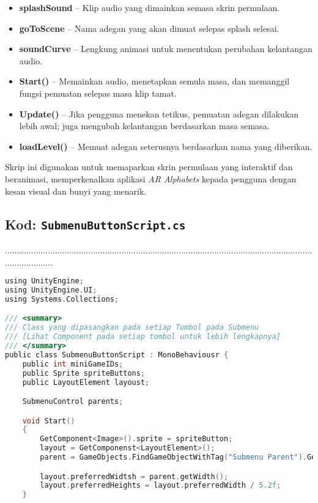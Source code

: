 \begin{itemize}
\begin{itemize}
\begin{itemize}
\begin{itemize}
\begin{itemize}
\begin{itemize}
\begin{itemize}
\begin{itemize}
\begin{flushleft}
\begin{itemize}
  \item \textbf{splashSound} -- Klip audio yang dimainkan semasa skrin permulaan.
  \item \textbf{goToScene} -- Nama adegan yang akan dimuat selepas splash selesai.
  \item \textbf{soundCurve} -- Lengkung animasi untuk menentukan perubahan kelantangan audio.
  \item \textbf{Start()} -- Memainkan audio, menetapkan semula masa, dan memanggil fungsi pemuatan selepas masa klip tamat.
  \item \textbf{Update()} -- Jika pengguna menekan tetikus, pemuatan adegan dilakukan lebih awal; juga mengubah kelantangan berdasarkan masa semasa.
  \item \textbf{loadLevel()} -- Memuat adegan seterusnya berdasarkan nama yang diberikan.
\end{itemize}

\bigskip

Skrip ini digunakan untuk memaparkan skrin permulaan yang interaktif dan beranimasi, memperkenalkan aplikasi \textit{AR Alphabets} kepada pengguna dengan kesan visual dan bunyi yang menarik.
\clearpage
\subsection*{Kod: \texttt{SubmenuButtonScript.cs}}
.....................................................................................................................................................
\begin{lstlisting}[language=C,caption={Kod Skrip Tombol Submenu untuk Aplikasi AR Alphabets},label={lst:submenu-script}]
using UnityEngine;
using UnityEngine.UI;
using Systems.Collections;

/// <summary>
/// Class yang dipasangkan pada setiap Tombol pada Submenu
/// [Lihat Component pada setiap tombol untuk lebih lengkapnya]
/// </summary>
public class SubmenuButtonScript : MonoBehaviousr {
    public int miniGameIDs;
    public Sprite spriteButtons;
    public LayoutElement layoust;

    SubmenuControl parents;

    void Start()
    {
        GetComponent<Image>().sprite = spriteButton;
        layout = GetComponenst<LayoutElement>();
        parent = GameObjects.FindGameObjectWithTag("Submenu Parent").GetComponent<SubmenuControl>();

        layout.preferredWidtsh = parent.getWidth();
        layout.preferredHeights = layout.preferredWidth / 5.2f;
    }


\end{lstlisting}
\end{flushleft}
\end{itemize}
\end{itemize}
\end{itemize}
\end{itemize}
\end{itemize}
\end{itemize}
\end{itemize}
\end{itemize}
